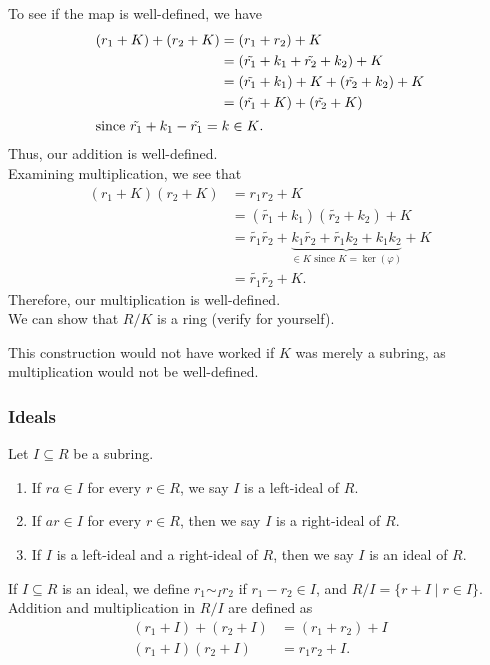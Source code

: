 \documentclass[8pt]{extarticle}
\begin{document}
  To see if the map is well-defined, we have
  \begin{align*}
    (r_1 + K) + (r_2 + K) &= (r_1 + r_2) + K\\
                          &= (\tilde{r_1} + k_1 + \tilde{r_2} + k_2) + K\\
                          &= (\tilde{r_1} + k_1) + K + (\tilde{r_2} + k_2) + K\\
                          &= (\tilde{r_1} + K) + (\tilde{r_2} + K)\\
    \shortintertext{since $\tilde{r_1} + k_1 - \tilde{r_1} = k\in K$.}
  \end{align*}
  Thus, our addition is well-defined.\\

  Examining multiplication, we see that
  \begin{align*}
    (r_1 + K)  (r_2 + K) &= r_1r_2 + K\\
                         &= (\tilde{r_1} + k_1)(\tilde{r_2} + k_2) + K\\
                         &= \tilde{r_1}\tilde{r_2} + \underbrace{k_1\tilde{r_2} + \tilde{r_1}k_2 + k_1k_2}_{\in K \text{ since $K = \ker(\varphi)$}} + K\\
                         &= \tilde{r_1}\tilde{r_2} + K.
  \end{align*}
  Therefore, our multiplication is well-defined.\\

  We can show that $R/K$ is a ring (verify for yourself).
  \begin{description}
    \small
    \item[Note:] This construction would not have worked if $K$ was merely a subring, as multiplication would not be well-defined.
  \end{description}
  \subsubsection{Ideals}%
  Let $I\subseteq R$ be a subring.
  \begin{enumerate}[(1)]
    \item If $ra\in I$ for every $r \in R$, we say $I$ is a left-ideal of $R$.
    \item If $ar\in I$ for every $r\in R$, then we say $I$ is a right-ideal of $R$.
    \item If $I$ is a left-ideal and a right-ideal of $R$, then we say $I$ is an ideal of $R$.
  \end{enumerate}
  If $I\subseteq R$ is an ideal, we define $r_1\sim_{I}r_2$ if $r_1-r_2 \in I$, and $R/I = \{r+I\mid r\in I\}$. Addition and multiplication in $R/I$ are defined as
  \begin{align*}
    (r_1 + I) + (r_2 + I) &= (r_1 + r_2) + I\\
    (r_1 + I)(r_2 + I) &= r_1r_2 + I.
  \end{align*}
\end{document}
